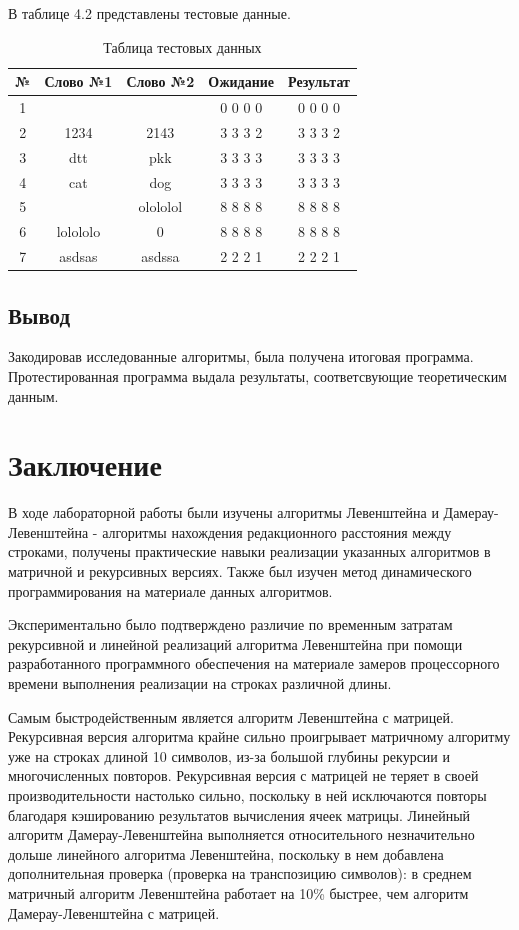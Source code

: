 \documentclass[12pt]{report}
\begin{document}
В таблице 4.2 представлены тестовые данные.

\begin{table} [H]
	\centering
	\caption{Таблица тестовых данных}
	\begin{tabular}{|c c c c c|} 
 	\hline
	№ & Слово №1 & Слово №2 & Ожидание & Результат \\ [0.8ex] 
 	\hline\hline
 	1 &  &  & 0 0 0 0 & 0 0 0 0\\
 	\hline
 	2 & 1234 & 2143 & 3 3 3 2 & 3 3 3 2\\
 	\hline
	3 & dtt & pkk & 3 3 3 3 & 3 3 3 3\\
	\hline
	4 & cat & dog & 3 3 3 3 & 3 3 3 3\\
	\hline
	5 &  & olololol & 8 8 8 8 & 8 8 8 8\\
	\hline
	6 & lolololo & 0 & 8 8 8 8 & 8 8 8 8\\
	\hline
	7 & asdsas & asdssa & 2 2 2 1  & 2 2 2 1\\
	\hline
	\end{tabular}
\end{table}


\section*{Вывод}
    Закодировав исследованные алгоритмы, была получена итоговая программа. Протестированная программа выдала результаты, соответсвующие теоретическим данным.  

\chapter*{Заключение}
В ходе лабораторной работы были изучены алгоритмы Левенштейна и Дамерау-Левенштейна - алгоритмы нахождения редакционного расстояния между строками, получены практические навыки реализации указанных алгоритмов в матричной  и рекурсивных версиях. Также был изучен метод динамического программирования на материале данных алгоритмов.

Экспериментально было подтверждено различие по временным затратам рекурсивной и линейной реализаций алгоритма Левенштейна при помощи разработанного программного обеспечения на материале замеров процессорного времени выполнения реализации на строках различной длины. 

Самым быстродейственным является алгоритм Левенштейна с матрицей.
Рекурсивная версия алгоритма крайне сильно проигрывает матричному алгоритму уже на строках длиной 10 символов, из-за большой глубины рекурсии и многочисленных повторов.
Рекурсивная версия с матрицей не теряет в своей производительности настолько сильно, поскольку в ней исключаются повторы благодаря кэшированию результатов вычисления ячеек матрицы. Линейный алгоритм Дамерау-Левенштейна выполняется относительного незначительно дольше линейного алгоритма Левенштейна, поскольку в нем добавлена дополнительная проверка (проверка на транспозицию символов): в среднем матричный алгоритм Левенштейна работает на 10\% быстрее, чем алгоритм Дамерау-Левенштейна с матрицей.
\end{document}
